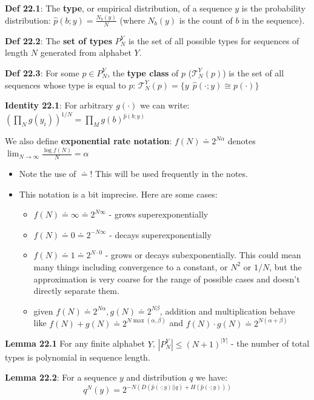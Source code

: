 \documentclass[12pt]{article} %
\begin{document}
\textbf{Def 22.1}: The \textbf{type}, or empirical distribution, of a sequence $y$ is the probability distribution: $\hat{p}(b;y) = \frac{N_b(y)}{N}$ (where $N_b(y)$ is the count of $b$ in the sequence).

\textbf{Def 22.2}: The \textbf{set of types} $P^Y_N$ is the set of all possible types for sequences of length $N$ generated from alphabet $Y$.

\textbf{Def 22.3}: For some $p \in P^Y_N$, the \textbf{type class} of $p$ ($\mathcal{T}_N^Y(p)$) is the set of all sequences whose type is equal to $p$: $\mathcal{T}_N^Y(p) = \{y \: \ \hat{p}(\cdot;y) \cong p(\cdot)\}$

\textbf{Identity 22.1}: For arbitrary $g(\cdot)$ we can write: $(\prod_N g(y_i))^{1/N} = \prod_M g(b)^{\hat{p}(b;y)}$

We also define \textbf{exponential rate notation}: $f(N) \mathbf{\doteq} 2^{N \alpha}$ denotes $\lim_{N \rightarrow \infty} \frac{\log f(N)}{N} = \alpha$
\begin{itemize}[topsep=-1pt, itemsep=-1pt]
    \item 
Note the use of $\doteq$! This will be used frequently in the notes.
    \item 
This notation is a bit imprecise. Here are some cases:
\begin{itemize}[topsep=-1pt, itemsep=-1pt]
    \item 
$f(N) \doteq \infty \doteq 2^{N\infty}$ - grows superexponentially
    \item 
$f(N) \doteq 0 \doteq 2^{-N\infty}$ - decays superexponentially
    \item 
$f(N) \doteq 1 \doteq 2^{N \cdot 0}$ - grows or decays subexponentially. This could mean many things including convergence to a constant, or $N^2$ or $1/N$, but the approximation is very coarse for the range of possible cases and doesn't directly separate them.
    \item given $f(N) \doteq 2^{N\alpha}, g(N) \doteq 2^{N\beta}$, addition and multiplication behave like $f(N) + g(N) \doteq 2^{N \max(\alpha, \beta)}$ and $f(N) \cdot g(N) \doteq 2^{N(\alpha + \beta)}$
\end{itemize}
\end{itemize}

\separate

\textbf{Lemma 22.1} For any finite alphabet $Y$, $|P_N^Y| \leq (N+1)^{|Y|}$ - the number of total types is polynomial in sequence length.

\textbf{Lemma 22.2}: For a sequence $y$ and distribution $q$ we have:
\begin{equation*}
    q^N(y) = 2^{-N(D(\hat{p}(\cdot;y) || q) + H(\hat{p}(\cdot; y)))}
\end{equation*}
\end{document}
